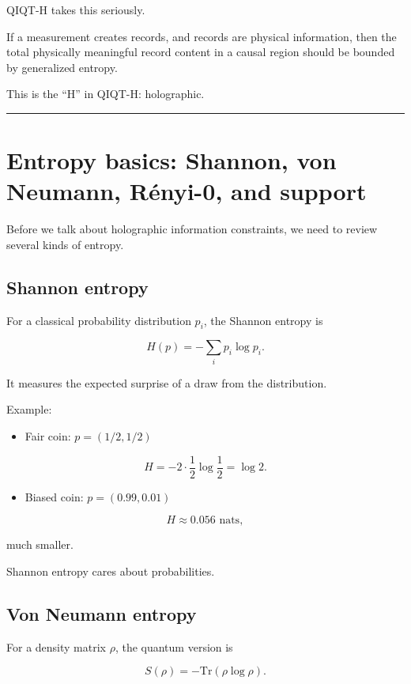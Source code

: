 \documentclass[11pt,a4paper]{article}
\begin{document}
QIQT-H takes this seriously.

If a measurement creates records, and records are physical information, then the total physically meaningful record content in a causal region should be bounded by generalized entropy.

This is the “H” in QIQT-H: holographic.

\medskip\hrule\medskip

\section{Entropy basics: Shannon, von Neumann, Rényi-0, and support}

Before we talk about holographic information constraints, we need to review several kinds of entropy.

\subsection{Shannon entropy}

For a classical probability distribution $p_i$, the Shannon entropy is

\[
H(p) = -\sum_i p_i \log p_i.
\]

It measures the expected surprise of a draw from the distribution.

Example:

\begin{itemize}
  \item Fair coin: $p=(1/2,1/2)$
\end{itemize}

\[
H = -2\cdot \frac12 \log \frac12 = \log 2.
\]

\begin{itemize}
  \item Biased coin: $p=(0.99,0.01)$
\end{itemize}

\[
H \approx 0.056 \text{ nats},
\]

much smaller.

Shannon entropy cares about probabilities.

\subsection{Von Neumann entropy}

For a density matrix $\rho$, the quantum version is

\[
S(\rho) = -\mathrm{Tr}(\rho \log \rho).
\]
\end{document}
